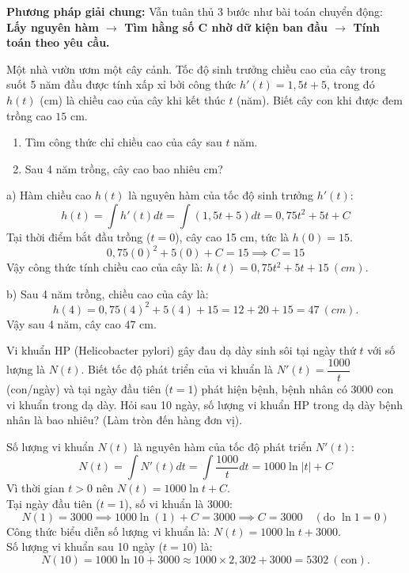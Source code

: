 \documentclass[12pt]{article}
\begin{document}
	\textbf{Phương pháp giải chung:} Vẫn tuân thủ 3 bước như bài toán chuyển động: \textbf{Lấy nguyên hàm $\rightarrow$ Tìm hằng số C nhờ dữ kiện ban đầu $\rightarrow$ Tính toán theo yêu cầu.}
	
	\begin{vidu}[3]
		Một nhà vườn ươm một cây cảnh. Tốc độ sinh trưởng chiều cao của cây trong suốt 5 năm đầu được tính xấp xỉ bởi công thức $h'(t) = 1,5t + 5$, trong đó $h(t)$ (cm) là chiều cao của cây khi kết thúc $t$ (năm). Biết cây con khi được đem trồng cao $15$ cm. 
		\begin{enumerate}[label=\alph*)]
			\item Tìm công thức chỉ chiều cao của cây sau $t$ năm.
			\item Sau 4 năm trồng, cây cao bao nhiêu cm?
		\end{enumerate}
	\end{vidu}
	
	\begin{loigiai}
		a) Hàm chiều cao $h(t)$ là nguyên hàm của tốc độ sinh trưởng $h'(t)$:
		$$h(t) = \int h'(t)dt = \int (1,5t + 5)dt = 0,75t^2 + 5t + C$$
		Tại thời điểm bắt đầu trồng ($t = 0$), cây cao 15 cm, tức là $h(0) = 15$.
		$$0,75(0)^2 + 5(0) + C = 15 \implies C = 15$$
		Vậy công thức tính chiều cao của cây là: $h(t) = 0,75t^2 + 5t + 15 \ (cm)$.
		
		\vspace{2mm}
		b) Sau 4 năm trồng, chiều cao của cây là:
		$$h(4) = 0,75(4)^2 + 5(4) + 15 = 12 + 20 + 15 = 47 \ (cm).$$
		Vậy sau 4 năm, cây cao $47$ cm.
	\end{loigiai}
	
	\begin{vidu}[4]
		Vi khuẩn HP (Helicobacter pylori) gây đau dạ dày sinh sôi tại ngày thứ $t$ với số lượng là $N(t)$. Biết tốc độ phát triển của vi khuẩn là $N'(t) = \dfrac{1000}{t}$ (con/ngày) và tại ngày đầu tiên ($t = 1$) phát hiện bệnh, bệnh nhân có $3000$ con vi khuẩn trong dạ dày. Hỏi sau 10 ngày, số lượng vi khuẩn HP trong dạ dày bệnh nhân là bao nhiêu? (Làm tròn đến hàng đơn vị).
	\end{vidu}
	
	\begin{loigiai}
		Số lượng vi khuẩn $N(t)$ là nguyên hàm của tốc độ phát triển $N'(t)$:
		$$N(t) = \int N'(t)dt = \int \frac{1000}{t} dt = 1000\ln|t| + C$$
		Vì thời gian $t > 0$ nên $N(t) = 1000\ln t + C$.\\
		Tại ngày đầu tiên ($t = 1$), số vi khuẩn là $3000$:
		$$N(1) = 3000 \implies 1000\ln(1) + C = 3000 \implies C = 3000 \quad (\text{do } \ln 1 = 0)$$
		Công thức biểu diễn số lượng vi khuẩn là: $N(t) = 1000\ln t + 3000$.\\
		Số lượng vi khuẩn sau 10 ngày ($t = 10$) là:
		$$N(10) = 1000\ln 10 + 3000 \approx 1000 \times 2,302 + 3000 = 5302 \ (\text{con}).$$
	\end{loigiai}
	
\end{document}
